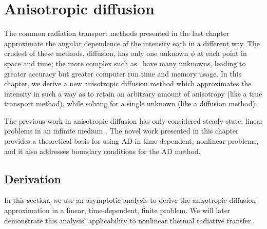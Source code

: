 
\chapter{Anisotropic diffusion}\label{chap:adDerivation}

The common radiation transport methods presented
in the last chapter approximate the angular dependence of the intensity each
in a different way. The crudest of these methods, diffusion, has only one
unknown
$\phi$ at each point in space and time; the more complex such as \SN\ have many
unknowns, leading to greater accuracy but greater computer run time and memory
usage. In this chapter, we derive a new anisotropic diffusion method which
approximates the intensity in such a way as to retain an arbitrary amount of
anisotropy (like a true transport method), while solving for a single unknown
(like a diffusion method).

The previous work in anisotropic diffusion has only considered steady-state,
linear problems in an infinite medium \cite{Lar2009c,Mor2007}. The novel work
presented in this chapter provides a
theoretical basis for using AD in time-dependent, nonlinear problems, and it
also addresses boundary conditions for the AD method.

\section{Derivation}\label{sec:adDerivation}

In this section, we use an asymptotic analysis to derive the anisotropic
diffusion approximation in a linear, time-dependent, finite problem. We will
later demonstrate this analysis' applicability to nonlinear thermal radiative
transfer.

